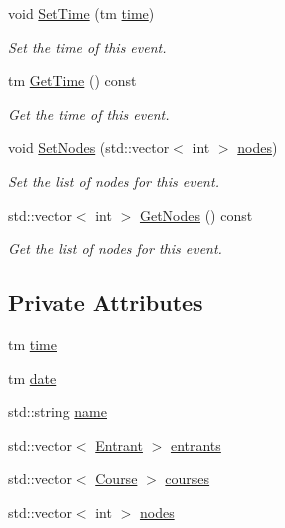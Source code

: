 \begin{DoxyCompactItemize}
void \hyperlink{classEvent_a693cefccd31003ade280a7e737f8be6c}{\-Set\-Time} (tm \hyperlink{classEvent_a91d5938dce4b4328e35f5626c22ec844}{time})
\begin{DoxyCompactList}\small\item\em \-Set the time of this event. \end{DoxyCompactList}\item 
tm \hyperlink{classEvent_aad5efdddefaa7de4196d1f22fce2c51e}{\-Get\-Time} () const 
\begin{DoxyCompactList}\small\item\em \-Get the time of this event. \end{DoxyCompactList}\item 
void \hyperlink{classEvent_a8f68ec5701be042f63a4f277af171adc}{\-Set\-Nodes} (std\-::vector$<$ int $>$ \hyperlink{classEvent_a2b330c8081c3c907a02daa7da8043fc6}{nodes})
\begin{DoxyCompactList}\small\item\em \-Set the list of nodes for this event. \end{DoxyCompactList}\item 
std\-::vector$<$ int $>$ \hyperlink{classEvent_ae3b200210aa9e4f20db5221d13d4746e}{\-Get\-Nodes} () const 
\begin{DoxyCompactList}\small\item\em \-Get the list of nodes for this event. \end{DoxyCompactList}\end{DoxyCompactItemize}
\subsection*{\-Private \-Attributes}
\begin{DoxyCompactItemize}
\item 
tm \hyperlink{classEvent_a91d5938dce4b4328e35f5626c22ec844}{time}
\item 
tm \hyperlink{classEvent_a5df9ecce46e9db33b3b29b99156aa70a}{date}
\item 
std\-::string \hyperlink{classEvent_ae116bf76fb01a92e000579a5a0d6f35c}{name}
\item 
std\-::vector$<$ \hyperlink{classEntrant}{\-Entrant} $>$ \hyperlink{classEvent_adede353249fa65a02148e7fcce077449}{entrants}
\item 
std\-::vector$<$ \hyperlink{classCourse}{\-Course} $>$ \hyperlink{classEvent_a54f5b521beee9f8714ac33e304c948b0}{courses}
\item 
std\-::vector$<$ int $>$ \hyperlink{classEvent_a2b330c8081c3c907a02daa7da8043fc6}{nodes}
\end{DoxyCompactItemize}



